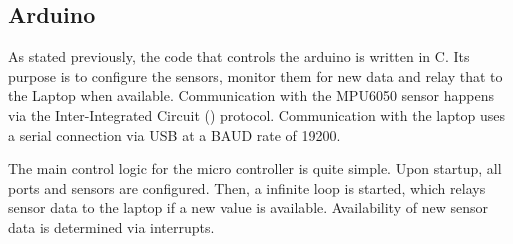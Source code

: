 \subsection{Arduino}
\label{subsec:arduino}

As stated previously, the code that controls the arduino is written in C.
Its purpose is to configure the sensors, monitor them for new data and relay that to the Laptop when available.
Communication with the MPU6050 sensor happens via the Inter-Integrated Circuit (\IIC) protocol.
Communication with the laptop uses a serial connection via USB at a BAUD rate of 19200.


The main control logic for the micro controller is quite simple. Upon startup, all ports and sensors are configured.
Then, a infinite loop is started, which relays sensor data to the laptop if a new value is available.
Availability of new sensor data is determined via interrupts.